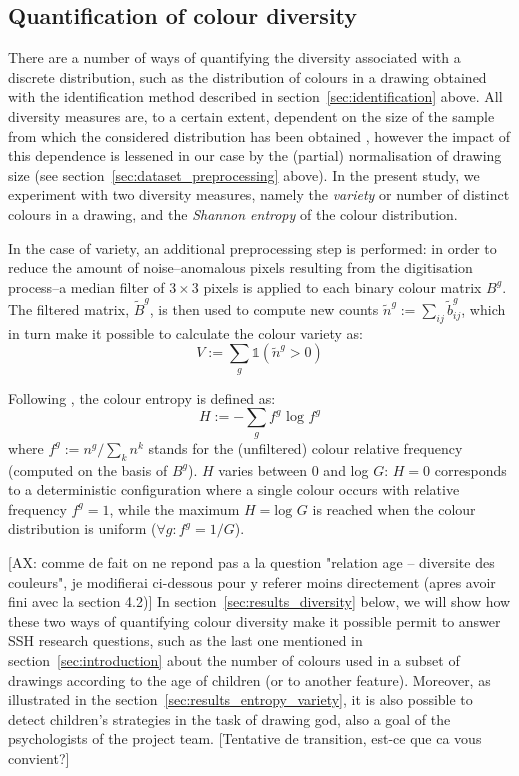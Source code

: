 \documentclass[11pt,a4paper]{article}
\begin{document}
\subsection{Quantification of colour diversity}
\label{sec:diversity}

There are a number of ways of quantifying the diversity associated with a discrete distribution, such as the distribution of colours in a drawing obtained with the identification method described in section~\ref{sec:identification} above. All diversity measures are, to a certain extent, dependent on the size of the sample from which the considered distribution has been obtained \cite[see e.g.][]{TweedieBaayen1998}, however the impact of this dependence is lessened in our case by the (partial) normalisation of drawing size (see section~\ref{sec:dataset_preprocessing} above). In the present study, we experiment with two diversity measures, namely the {\em variety} or number of distinct colours in a drawing, and the {\em Shannon entropy} of the colour distribution.

In the case of variety, an additional preprocessing step is performed: in order to reduce the amount of noise--anomalous pixels resulting from the digitisation process--a median filter of \(3 \times 3\) pixels is applied to each binary colour matrix $B^{g}$. The filtered matrix, $\tilde{B}^{g}$, is then used to compute new counts $\tilde{n}^{g} := \sum_{ij}\tilde{b}_{ij}^{g}$, which in turn make it possible to calculate the colour variety as:
\begin{equation}
	V := \sum_{g}\mathds{1}(\tilde{n}^{g} > 0)
\end{equation}

Following \citet{Shannon1948}, the colour entropy is defined as:
\begin{equation}
	H := -\sum_{g} f^{g}\mbox{ log }f^{g}
\end{equation}
where $f^{g}:= n^{g}/\sum_{k}n^{k}$ stands for the (unfiltered) colour relative frequency (computed on the basis of $B^{g}$). $H$ varies between 0 and log $G$: $H=0$ corresponds to a deterministic configuration where a single colour occurs with relative frequency $f^{g} = 1$, while the maximum $H=\mbox{log }G$ is reached when the colour distribution is uniform ($\forall g: f^{g} = 1/G$).

{\color{green}[AX: comme de fait on ne repond pas a la question "relation age -- diversite des couleurs", je modifierai ci-dessous pour y referer moins directement (apres avoir fini avec la section 4.2)]}
In section~\ref{sec:results_diversity} below, we will show how these two ways of quantifying colour diversity make it possible  permit to answer SSH research questions, such as the last one mentioned in section~\ref{sec:introduction} about the number of colours used in a subset of drawings according to the age of children (or to another feature). Moreover, as illustrated in the section~\ref{sec:results_entropy_variety}, it is also possible to detect children's strategies in the task of drawing god, also a goal of the psychologists of the project team. {\color{red} [Tentative de transition, est-ce que ca vous convient?]}
\end{document}
